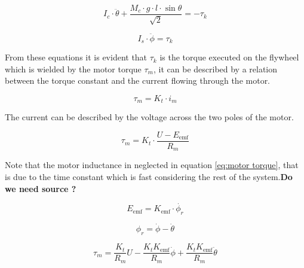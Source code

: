 \documentclass[a4paper,11pt]{kth-mag}
\begin{document}
\begin{equation} \label{eq:negativeL2}
I_c \cdot \ddot{\theta} + \frac{M_c \cdot g \cdot l \cdot \sin \theta }{\sqrt{2}}  = -\tau_k
\end{equation}

\begin{equation} \label{eq:postiveL2}
I_s \cdot \ddot{\phi} = \tau_k
\end{equation}

From these equations it is evident that $\tau_k$ is the torque executed on the flywheel which is wielded by the motor torque $\tau_m$, it can be described by a relation between the torque constant and the current flowing through the motor.

\begin{equation}
\tau_m = K_t \cdot i_m
\end{equation}

The current can be described by the voltage across the two poles of the motor.

\begin{equation} \label{eq:motor torque}
\tau_m = K_t \cdot \frac{U-E_{\text{emf}} }{R_m}
\end{equation}

Note that the motor inductance in neglected in equation \eqref{eq:motor torque}, that is due to the time constant which is fast considering the rest of the system.\textbf{Do we need source ?}

\begin{equation}
E_{\text{emf}} = K_{\text{emf}} \cdot \dot{\phi_r}
\end{equation}

\begin{equation}
\phi_r = \dot{\phi} - \dot{\theta}
\end{equation}
 
\begin{equation} \label{eq:tau}
\tau_m = \frac{K_t}{R_m} U - \frac{K_t K_{\text{emf}} }{R_m} \dot{\phi} + \frac{K_t K_{\text{emf}} }{R_m} \dot{\theta}
\end{equation}
\end{document}
